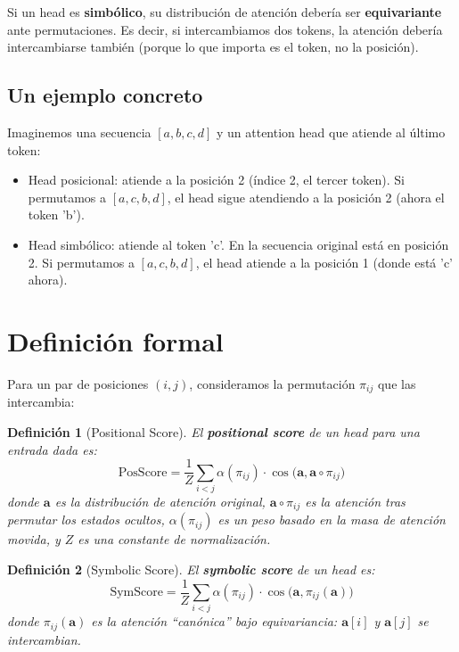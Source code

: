 \documentclass[12pt,a4paper,oneside]{report}
\newtheorem{definition}{Definición}[chapter]
\begin{document}
Si un head es \textbf{simbólico}, su distribución de atención debería ser \textbf{equivariante} ante permutaciones. Es decir, si intercambiamos dos tokens, la atención debería intercambiarse también (porque lo que importa es el token, no la posición).

\subsection{Un ejemplo concreto}

Imaginemos una secuencia $[a, b, c, d]$ y un attention head que atiende al último token:
\begin{itemize}
    \item Head posicional: atiende a la posición 2 (índice 2, el tercer token). Si permutamos a $[a, c, b, d]$, el head sigue atendiendo a la posición 2 (ahora el token 'b').
    \item Head simbólico: atiende al token 'c'. En la secuencia original está en posición 2. Si permutamos a $[a, c, b, d]$, el head atiende a la posición 1 (donde está 'c' ahora).
\end{itemize}

\section{Definición formal}

Para un par de posiciones $(i, j)$, consideramos la permutación $\pi_{ij}$ que las intercambia:

\begin{definition}[Positional Score]
El \textbf{positional score} de un head para una entrada dada es:
\[
\text{PosScore} = \frac{1}{Z} \sum_{i<j} \alpha(\pi_{ij}) \cdot \cos\bigl(\mathbf{a}, \mathbf{a} \circ \pi_{ij}\bigr)
\]
donde $\mathbf{a}$ es la distribución de atención original, $\mathbf{a} \circ \pi_{ij}$ es la atención tras permutar los estados ocultos, $\alpha(\pi_{ij})$ es un peso basado en la masa de atención movida, y $Z$ es una constante de normalización.
\end{definition}

\begin{definition}[Symbolic Score]
El \textbf{symbolic score} de un head es:
\[
\text{SymScore} = \frac{1}{Z} \sum_{i<j} \alpha(\pi_{ij}) \cdot \cos\bigl(\mathbf{a}, \pi_{ij}(\mathbf{a})\bigr)
\]
donde $\pi_{ij}(\mathbf{a})$ es la atención ``canónica'' bajo equivariancia: $\mathbf{a}[i]$ y $\mathbf{a}[j]$ se intercambian.
\end{definition}
\end{document}
